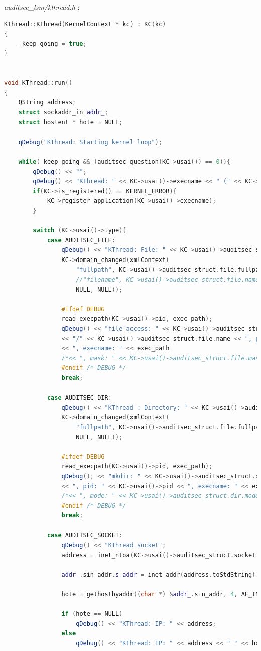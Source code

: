\documentclass[pdftex,a4paper,titlepage,11pt]{article}
\begin{document}
\textit{auditsec\_lsm/kthread.h} : 
\begin{lstlisting}[language=C++]
KThread::KThread(KernelContext * kc) : KC(kc)
{
	_keep_going = true;
}


void KThread::run()
{
	QString address;
	struct sockaddr_in addr_;
	struct hostent * hote = NULL;

	qDebug("KThread: Starting kernel loop");

	while(_keep_going && (auditsec_question(KC->usai()) == 0)){
		qDebug() << "";
		qDebug() << "KThread: " << KC->usai()->execname << " (" << KC->usai()->pid << ")";
		if(KC->is_registered() == KERNEL_ERROR){
			KC->register_application(KC->usai()->execname);
		}

		switch (KC->usai()->type){
			case AUDITSEC_FILE:
				qDebug() << "KThread: File: " << KC->usai()->auditsec_struct.file.fullpath;
				KC->domain_changed(xmlContext(
					"fullpath", KC->usai()->auditsec_struct.file.fullpath,
					//"filename", KC->usai()->auditsec_struct.file.name,
					NULL, NULL));

				#ifdef DEBUG
				read_execpath(KC->usai()->pid, exec_path);
				qDebug() << "file access: " << KC->usai()->auditsec_struct.file.fullpath
				<< "/" << KC->usai()->auditsec_struct.file.name << ", pid: " << KC->usai()->pid
				<< ", execname: " << exec_path
				/*<< ", mask: " << KC->usai()->auditsec_struct.file.mask*/;
				#endif /* DEBUG */
				break;

			case AUDITSEC_DIR:
				qDebug() << "KThread : Directory: " << KC->usai()->auditsec_struct.file.fullpath;
				KC->domain_changed(xmlContext(
					"fullpath", KC->usai()->auditsec_struct.file.fullpath,
					NULL, NULL));

				#ifdef DEBUG
				read_execpath(KC->usai()->pid, exec_path);
				qDebug(); << "mkdir: " << KC->usai()->auditsec_struct.dir.fullpath
				<< ", pid: " << KC->usai()->pid << ", execname: " << exec_path << KC->usai()->execname
				/*<< ", mode: " << KC->usai()->auditsec_struct.dir.mode*/;
				#endif /* DEBUG */
				break;
			
			case AUDITSEC_SOCKET:
				qDebug() << "KThread socket";
				address = inet_ntoa(KC->usai()->auditsec_struct.socket.addr.addr4.sin_addr);
				
				addr_.sin_addr.s_addr = inet_addr(address.toStdString().c_str());
				
				hote = gethostbyaddr((char *) &addr_.sin_addr, 4, AF_INET);
				
				if (hote == NULL)
					qDebug() << "KThread: IP: " << address;
				else
					qDebug() << "KThread: IP: " << address << " " << hote->h_name;
				

\end{lstlisting}
\end{document}
